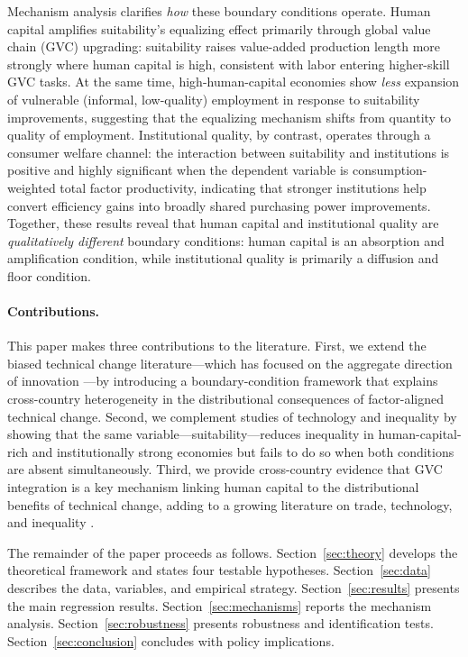 \documentclass[12pt]{article}
\begin{document}
Mechanism analysis clarifies \emph{how} these boundary conditions
operate.
Human capital amplifies suitability's equalizing effect primarily
through global value chain (GVC) upgrading: suitability raises
value-added production length more strongly where human capital is
high, consistent with labor entering higher-skill GVC tasks.
At the same time, high-human-capital economies show \emph{less}
expansion of vulnerable (informal, low-quality) employment in
response to suitability improvements, suggesting that the equalizing
mechanism shifts from quantity to quality of employment.
Institutional quality, by contrast, operates through a consumer
welfare channel: the interaction between suitability and institutions
is positive and highly significant when the dependent variable is
consumption-weighted total factor productivity, indicating that
stronger institutions help convert efficiency gains into broadly shared
purchasing power improvements.
Together, these results reveal that human capital and institutional
quality are \emph{qualitatively different} boundary conditions:
human capital is an absorption and amplification condition,
while institutional quality is primarily a diffusion and floor condition.

\paragraph{Contributions.}
This paper makes three contributions to the literature.
First, we extend the biased technical change literature---which has
focused on the aggregate direction of innovation
\citep{acemoglu2002directed, acemoglu2018race,
acemoglu2020robots, acemoglu2022tasks}---by
introducing a boundary-condition framework that explains
cross-country heterogeneity in the distributional consequences of
factor-aligned technical change.
Second, we complement studies of technology and inequality
\citep{jaumotte2013rising, krusell2000capitalskill,
moll2022uneven, karabarbounis2014global} by
showing that the same variable---suitability---reduces inequality
in human-capital-rich and institutionally strong economies but
fails to do so when both conditions are absent simultaneously.
Third, we provide cross-country evidence that GVC integration
is a key mechanism linking human capital to the distributional
benefits of technical change, adding to a growing literature
on trade, technology, and inequality
\citep{hornbeck2024estimating, rodriguez1999trade, timmer2015emerging}.

The remainder of the paper proceeds as follows.
Section~\ref{sec:theory} develops the theoretical framework and
states four testable hypotheses.
Section~\ref{sec:data} describes the data, variables, and empirical
strategy.
Section~\ref{sec:results} presents the main regression results.
Section~\ref{sec:mechanisms} reports the mechanism analysis.
Section~\ref{sec:robustness} presents robustness and identification
tests.
Section~\ref{sec:conclusion} concludes with policy implications.
\end{document}
